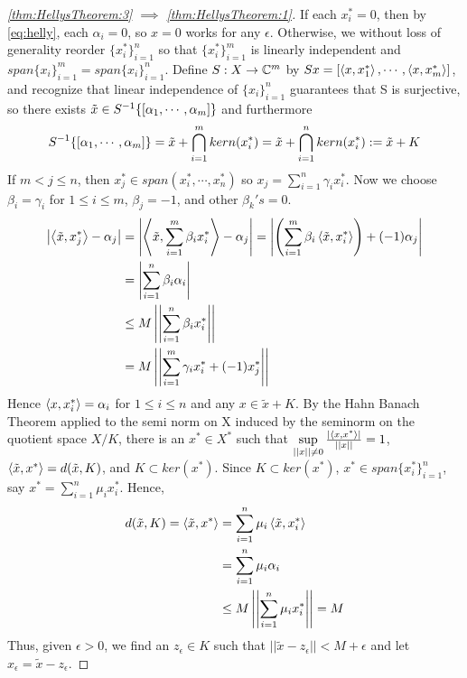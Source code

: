 \begin{thm}
\begin{proof}[\ref{thm:HellysTheorem:3} $\implies$ \ref{thm:HellysTheorem:1}]
        If each $x_i^*=0$, then by    \ref{eq:helly}, each $\alpha_i=0$, so $x=0$ works for any $\epsilon$. 
        Otherwise, we without loss of generality reorder $\{x_i^*\}_{i=1}^n$ so that $\{x_i^*\}_{i=1}^m$ is linearly independent and $span\{x_i\}_{i=1}^m=span\{x_i\}_{i=1}^n$. 
        Define $S:X \to \mathbb{C}^{m}$ by $Sx=\left[ \left\langle x,x_1^* \right\rangle,\cdots,\left\langle x,x_m^* \right\rangle \right]$, and recognize that linear independence of $\{x_i\}_{i=1}^n$ guarantees that S is surjective, so there exists 
        $\tilde{x} \in S^{-1} \{ \left[ \alpha_1,\cdots,\alpha_m \right]\}$ and furthermore
        \begin{equation}
            S^{-1}\{ \left[ \alpha_1,\cdots,\alpha_m \right]\}=\tilde{x}+ \bigcap_{i=1}^m kern(x_i^*) = \tilde{x}+ \bigcap_{i=1}^n kern(x_i^*):=\tilde{x}+K 
        \end{equation}
        If $m < j \leq n$, then $x_j^* \in span(x_i^*,\cdots,x_n^*)$ so  $x_j = \sum_{i=1}^n \gamma_i x_i^*$.
        Now we choose $\beta_i=\gamma_i$ for $1 \leq i \leq m$, $\beta_j=-1$, and other $\beta_k's=0$. 
        \begin{align} 
            \left| \left\langle \tilde{x},x_j^* \right\rangle-\alpha_j \right|&= \left| \left\langle \tilde{x},\sum_{i=1}^m \beta_i x_i^* \right\rangle-\alpha_j \right| = \left|  \left( \sum_{i=1}^m \beta_i \left\langle \tilde{x},x_i^* \right\rangle\right)+(-1)\alpha_j \right|\\
            &=\left| \sum_{i=1}^n \beta_i \alpha_i \right| \\
            &\leq M \left|\left| \sum_{i=1}^n \beta_i x_i^* \right|\right| \\
            & =M\left|\left| \sum_{i=1}^m \gamma_i x_i^* + (-1) x_j^* \right|\right|
        \end{align}
        Hence $\left\langle x,x_i^* \right\rangle = \alpha_i$ for $1 \leq i \leq n$ and any $x \in \tilde{x}+K$. 
        By the Hahn Banach Theorem applied to the semi norm on X induced by the seminorm on the quotient space $X/K$, there is an $x^* \in X^*$ such that $\sup\limits_{\left|\left| x \right|\right| \neq 0} \frac{\left| \left\langle x,x^* \right\rangle \right|}{\left|\left| x \right|\right|} =1$, $\left\langle \tilde{x},x^* \right\rangle = d(\tilde{x},K)$, and $K \subset ker(x^*)$. Since $K \subset ker(x^*)$, $x^* \in span \{ x_i^*\}_{i=1}^n$, say $x^* = \sum_{i=1}^n \mu_i x_i^*$. 
        Hence, 
        \begin{equation}
            \begin{split}
                d(\tilde{x},K) = \left\langle \tilde{x},x^* \right\rangle & = \sum_{i=1}^n \mu_i \left\langle \tilde{x},x_i^* \right\rangle\\
                & = \sum_{i=1}^n \mu_i \alpha_i\\
                & \leq M\left|\left| \sum_{i=1}^n \mu_i x_i^* \right|\right|=M 
            \end{split}
        \end{equation}
        Thus, given $\epsilon > 0$, we find an $z_\epsilon \in K$ such that $||\tilde{x}-z_\epsilon|| < M+\epsilon$ and let $x_\epsilon=\tilde{x}-z_\epsilon$. 
        
    \end{proof}
    
\end{thm}


